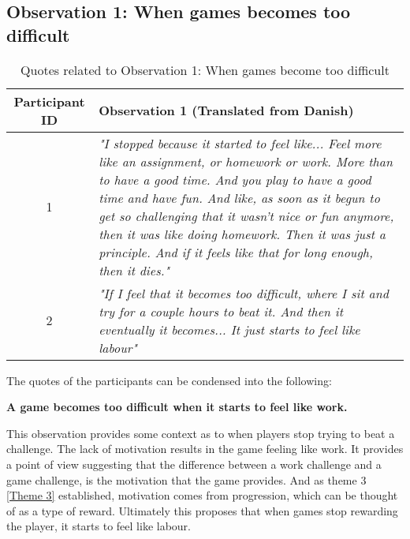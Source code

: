 \subsection{Observation 1: When games becomes too difficult}\label{Observation 1}
\begin{table}[H]

\centering
\begin{tabular}{@{}c p{11cm}@{}}
\toprule
\textbf{Participant ID} & \textbf{Observation 1} (Translated from Danish)\\
\midrule

1 & \textit{"I stopped because it started to feel like... Feel more like an assignment, or homework or work. More than to have a good time. And you play to have a good time and have fun. And like, as soon as it begun to get so challenging that it wasn't nice or fun anymore, then it was like doing homework. Then it was just a principle. And if it feels like that for long enough, then it dies."}\\

\midrule

2& \textit{"If I feel that it becomes too difficult, where I sit and try for a couple hours to beat it. And then it eventually it becomes... It just starts to feel like labour"}\\
\bottomrule
\end{tabular}

\caption{Quotes related to Observation 1: When games become too difficult}
\label{tab:obs1-quotes}
\end{table}

The quotes of the participants can be condensed into the following:
\begin{center}
    \textbf{A game becomes too difficult when it starts to feel like work.}
\end{center}

This observation provides some context as to when players stop trying to beat a challenge. The lack of motivation results in the game feeling like work. It provides a point of view suggesting that the difference between a work challenge and a game challenge, is the motivation that the game provides. And as theme 3 \ref{Theme 3} established, motivation comes from progression, which can be thought of as a type of reward. Ultimately this proposes that when games stop rewarding the player, it starts to feel like labour. 

